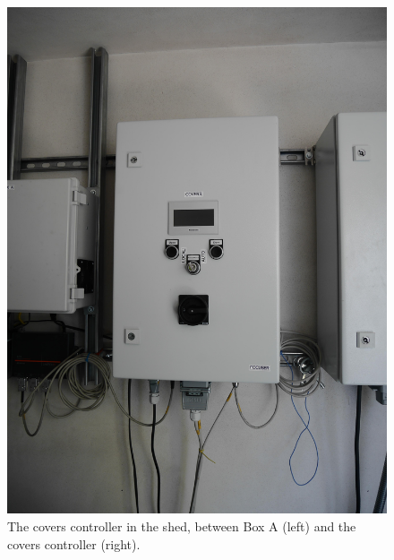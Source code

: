 \begin{figure}
\begin{center}
\includegraphics[width=0.8\linewidth]{figures/covers-controller.jpg}
\end{center}
\caption{The covers controller in the shed, between Box A (left) and the covers controller (right).}
\label{figure:covers-controller}
\end{figure}

